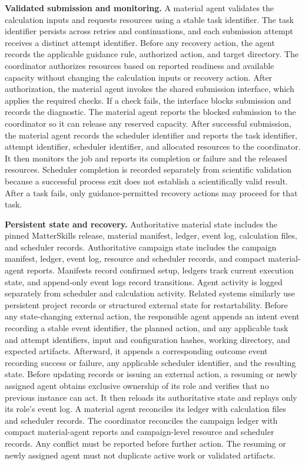 \documentclass[aip,jap,reprint]{revtex4-2}
\begin{document}
\noindent\textbf{Validated submission and monitoring.} A material agent validates the calculation inputs and requests resources using a stable task identifier. The task identifier persists across retries and continuations, and each submission attempt receives a distinct attempt identifier. Before any recovery action, the agent records the applicable guidance rule, authorized action, and target directory. The coordinator authorizes resources based on reported readiness and available capacity without changing the calculation inputs or recovery action. After authorization, the material agent invokes the shared submission interface, which applies the required checks. If a check fails, the interface blocks submission and records the diagnostic. The material agent reports the blocked submission to the coordinator so it can release any reserved capacity. After successful submission, the material agent records the scheduler identifier and reports the task identifier, attempt identifier, scheduler identifier, and allocated resources to the coordinator. It then monitors the job and reports its completion or failure and the released resources. Scheduler completion is recorded separately from scientific validation because a successful process exit does not establish a scientifically valid result. After a task fails, only guidance-permitted recovery actions may proceed for that task.

\noindent\textbf{Persistent state and recovery.} Authoritative material state includes the pinned MatterSkills release, material manifest, ledger, event log, calculation files, and scheduler records. Authoritative campaign state includes the campaign manifest, ledger, event log, resource and scheduler records, and compact material-agent reports. Manifests record confirmed setup, ledgers track current execution state, and append-only event logs record transitions. Agent activity is logged separately from scheduler and calculation activity. Related systems similarly use persistent project records or structured external state for restartability.\cite{catmaster,elagentegraphico} Before any state-changing external action, the responsible agent appends an intent event recording a stable event identifier, the planned action, and any applicable task and attempt identifiers, input and configuration hashes, working directory, and expected artifacts. Afterward, it appends a corresponding outcome event recording success or failure, any applicable scheduler identifier, and the resulting state. Before updating records or issuing an external action, a resuming or newly assigned agent obtains exclusive ownership of its role and verifies that no previous instance can act. It then reloads its authoritative state and replays only its role's event log. A material agent reconciles its ledger with calculation files and scheduler records. The coordinator reconciles the campaign ledger with compact material-agent reports and campaign-level resource and scheduler records. Any conflict must be reported before further action. The resuming or newly assigned agent must not duplicate active work or validated artifacts.
\end{document}
